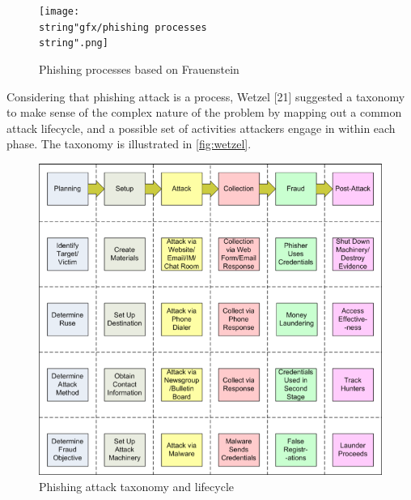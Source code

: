 \begin{figure}
\begin{centering}
\texttt{[image: \\string"gfx/phishing processes\\string".png]}
\par\end{centering}

\protect\caption{\label{fig:frauenstein}Phishing processes based on Frauenstein\citep{frauenstein:2013}}


\end{figure}


Considering that phishing attack is a process, Wetzel {[}21{]} suggested
a taxonomy to make sense of the complex nature of the problem by mapping
out a common attack lifecycle, and a possible set of activities attackers
engage in within each phase. The taxonomy is illustrated in \autoref{fig:wetzel}.

\begin{figure}
\begin{centering}
\includegraphics[scale=0.4]{gfx/wetzel}\protect\caption{\label{fig:wetzel}Phishing attack taxonomy and lifecycle\citep{wetzel:2005}}

\par\end{centering}

\end{figure}


